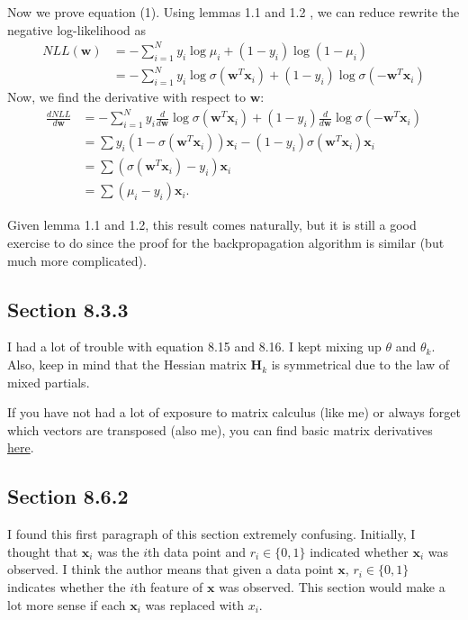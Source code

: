 \documentclass[a4paper,11pt]{article}
\theoremstyle{plain}
\newcounter{exercise}
\begin{document}
Now we prove equation (1). Using lemmas 1.1 and 1.2 , we can
reduce rewrite the negative log-likelihood as \\
\begin{align*}
    NLL(\mathbf{w})&=-\sum \limits_{i=1}^{N}y_i\log\mu_i +
    (1-y_i)\log(1-\mu_i) \\
    & = -\sum \limits_{i=1}^{N}y_i\log\sigma(\mathbf{w}^{T}
    \mathbf{x}_i) + (1 - y_i)\log\sigma(-\mathbf{w}^{T}
    \mathbf{x}_i)
\end{align*}
Now, we find the derivative with respect to $\mathbf{w}$:
\begin{align*}
    \frac{dNLL}{d\mathbf{w}}
    &= -\sum \limits_{i=1}^{N}y_i
    \frac{d}{d\mathbf{w}}
    \log\sigma(\mathbf{w}^{T}\mathbf{x}_i) + 
    (1 - y_i)
    \frac{d}{d\mathbf{w}}
    \log\sigma(-\mathbf{w}^{T} \mathbf{x}_i) \\
    &= \sum
    y_i (1-\sigma(\mathbf{w}^{T}\mathbf{x}_i))\mathbf{x}_i
    -(1-y_i)\sigma(\mathbf{w}^{T}\mathbf{x}_i)\mathbf{x}_i\\
    &= \sum (\sigma(\mathbf{w}^{T}\mathbf{x}_i)-y_i)
    \mathbf{x}_i \\
    &= \sum (\mu_i - y_i)\mathbf{x}_i.
\end{align*}

Given lemma 1.1 and 1.2, this result comes naturally,
but it is still a good exercise to do since the proof for
the backpropagation algorithm is similar (but much more
complicated).

\subsection*{Section 8.3.3}
I had a lot of trouble with equation 8.15 and 8.16. I 
kept mixing up $\theta$ and $\theta_k$. Also, keep in
mind that the Hessian matrix $\mathbf{H}_k$ is symmetrical
due to the law of mixed partials.

If you have not had a lot of exposure to matrix calculus (like me)
or always forget which vectors are transposed (also me),
you can find basic matrix derivatives
\href{http://www.gatsby.ucl.ac.uk/teaching/courses/sntn/sntn-2017/resources/Matrix_derivatives_cribsheet.pdf}{here}.

\subsection*{Section 8.6.2}
I found this first paragraph of this section extremely confusing. Initially, I thought
that $\mathbf{x}_i$ was the $i$th data point and $r_i  \in \{0, 1\}$ indicated whether
$ \mathbf{x}_i$ was observed. I think the author means that given a
data point $\mathbf{x}$, $r_i\in\{0, 1\}$ indicates whether the $i$th feature of
$\mathbf{x}$ was observed. This section would make a lot more sense if each $\mathbf{x}_i$ 
was replaced with $x_i$.
\end{document}
